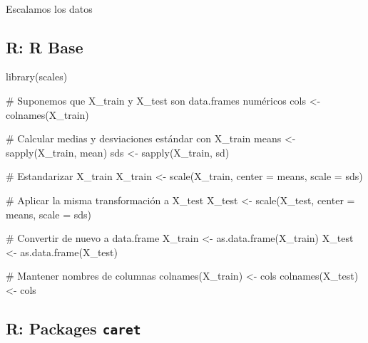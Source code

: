 \documentclass[
  letterpaper,
  DIV=11,
  numbers=noendperiod]{scrartcl}
\makeatletter
\let\oldparagraph\paragraph
\renewcommand{\paragraph}{
    \@ifstar
      \xxxParagraphStar
      \xxxParagraphNoStar
  }
\newcommand{\xxxParagraphStar}[1]{\oldparagraph*{#1}\mbox{}}
\newcommand{\xxxParagraphNoStar}[1]{\oldparagraph{#1}\mbox{}}
\newenvironment{Shaded}{\begin{snugshade}}{\end{snugshade}}
\newcommand{\AttributeTok}[1]{\textcolor[rgb]{0.40,0.45,0.13}{#1}}
\newcommand{\CommentTok}[1]{\textcolor[rgb]{0.37,0.37,0.37}{#1}}
\newcommand{\FunctionTok}[1]{\textcolor[rgb]{0.28,0.35,0.67}{#1}}
\newcommand{\NormalTok}[1]{\textcolor[rgb]{0.00,0.23,0.31}{#1}}
\newcommand{\OtherTok}[1]{\textcolor[rgb]{0.00,0.23,0.31}{#1}}
\makeatother
\begin{document}
\paragraph{Escalamos los datos}\label{escalamos-los-datos}

\subsection{R: R Base}

\begin{Shaded}
\begin{Highlighting}[]
\FunctionTok{library}\NormalTok{(scales)}

\CommentTok{\# Suponemos que X\_train y X\_test son data.frames numéricos}
\NormalTok{cols }\OtherTok{\textless{}{-}} \FunctionTok{colnames}\NormalTok{(X\_train)}

\CommentTok{\# Calcular medias y desviaciones estándar con X\_train}
\NormalTok{means }\OtherTok{\textless{}{-}} \FunctionTok{sapply}\NormalTok{(X\_train, mean)}
\NormalTok{sds }\OtherTok{\textless{}{-}} \FunctionTok{sapply}\NormalTok{(X\_train, sd)}

\CommentTok{\# Estandarizar X\_train}
\NormalTok{X\_train }\OtherTok{\textless{}{-}} \FunctionTok{scale}\NormalTok{(X\_train, }\AttributeTok{center =}\NormalTok{ means, }\AttributeTok{scale =}\NormalTok{ sds)}

\CommentTok{\# Aplicar la misma transformación a X\_test}
\NormalTok{X\_test }\OtherTok{\textless{}{-}} \FunctionTok{scale}\NormalTok{(X\_test, }\AttributeTok{center =}\NormalTok{ means, }\AttributeTok{scale =}\NormalTok{ sds)}

\CommentTok{\# Convertir de nuevo a data.frame}
\NormalTok{X\_train }\OtherTok{\textless{}{-}} \FunctionTok{as.data.frame}\NormalTok{(X\_train)}
\NormalTok{X\_test }\OtherTok{\textless{}{-}} \FunctionTok{as.data.frame}\NormalTok{(X\_test)}

\CommentTok{\# Mantener nombres de columnas}
\FunctionTok{colnames}\NormalTok{(X\_train) }\OtherTok{\textless{}{-}}\NormalTok{ cols}
\FunctionTok{colnames}\NormalTok{(X\_test) }\OtherTok{\textless{}{-}}\NormalTok{ cols}
\end{Highlighting}
\end{Shaded}

\subsection{\texorpdfstring{R: Packages
\texttt{caret}}{R: Packages caret}}
\end{document}
